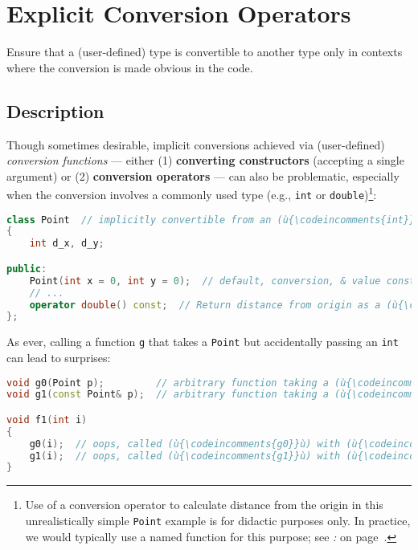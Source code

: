 \newpage
\section[{\tt explicit} Operators]{Explicit Conversion Operators}\label{explicit-conversion-operators}


Ensure that a (user-defined) type is convertible to another type only in
contexts where the conversion is made obvious in the code.

\subsection[Description]{Description}\label{description-explicitconv}

Though sometimes desirable, implicit conversions achieved via (user-defined) \emph{conversion
functions} --- either (1) \textbf{converting constructors} (accepting a
single argument) or (2) \textbf{conversion operators} --- can also be problematic, especially when the
conversion involves a commonly used type (e.g., \texttt{int} or
\texttt{double}){\cprotect\footnote{Use of a conversion operator to
calculate distance from the origin in this unrealistically simple \texttt{Point}
example is for didactic purposes only. In practice, we would typically
use a named function for this purpose; see {\it{}: } on page~\pageref{sometimes-a-named-function-is-better}.}}:

\begin{lstlisting}[language=C++]
class Point  // implicitly convertible from an (ù{\codeincomments{int}}ù) or to a (ù{\codeincomments{double}}ù)
{
    int d_x, d_y;

public:
    Point(int x = 0, int y = 0);  // default, conversion, & value constructor
    // ...
    operator double() const;  // Return distance from origin as a (ù{\codeincomments{double}}ù).
};
\end{lstlisting}

\noindent As ever, calling a function \texttt{g} that takes a \texttt{Point} but
accidentally passing an \texttt{int} can lead to surprises:

\begin{lstlisting}[language=C++]
void g0(Point p);         // arbitrary function taking a (ù{\codeincomments{Point}}ù) object by value
void g1(const Point& p);  // arbitrary function taking a (ù{\codeincomments{Point}}ù) by (ù{\codeincomments{const}}ù) reference

void f1(int i)
{
    g0(i);  // oops, called (ù{\codeincomments{g0}}ù) with (ù{\codeincomments{Point(i, 0)}}ù) by mistake
    g1(i);  // oops, called (ù{\codeincomments{g1}}ù) with (ù{\codeincomments{Point(i, 0)}}ù) by mistake
}
\end{lstlisting}

